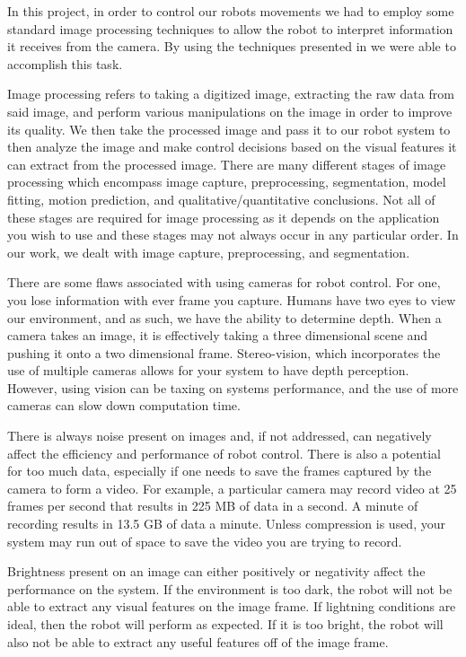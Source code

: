 \documentclass[12pt]{article}
\begin{document}
 In this project, in order to control our robots movements we had to employ some standard image processing techniques to allow the robot to interpret information it receives from the camera. By using the techniques presented in \cite{ImageProcessingTextBook} we were able to accomplish this task.

Image processing refers to taking a digitized image, extracting the raw data from said image, and perform various manipulations on the image in order to improve its quality. We then take the processed image and pass it to our robot system to then analyze the image and make control decisions based on the visual features it can extract from the processed image. There are many different stages of image processing which encompass image capture, preprocessing, segmentation, model fitting, motion prediction, and qualitative/quantitative conclusions. Not all of these stages are required for image processing as it depends on the application you wish to use and these stages may not always occur in any particular order. In our work, we dealt with image capture, preprocessing, and segmentation.

There are some flaws associated with using cameras for robot control. For one, you lose information with ever frame you capture. Humans have two eyes to view our environment, and as such, we have the ability to determine depth. When a camera takes an image, it is effectively taking a three dimensional scene and pushing it onto a two dimensional frame. Stereo-vision, which incorporates the use of multiple cameras allows for your system to have depth perception. However, using vision can be taxing on systems performance, and the use of more cameras can slow down computation time. 

There is always noise present on images and, if not addressed, can negatively affect the efficiency and performance of robot control. There is also a potential for too much data, especially if one needs to save the frames captured by the camera to form a video. For example, a particular camera may record video at 25 frames per second that results in 225 MB of data in a second. A minute of recording results in 13.5 GB of data a minute. Unless compression is used, your system may run out of space to save the video you are trying to record. 

Brightness present on an image can either positively or negativity affect the performance on the system. If the environment is too dark, the robot will not be able to extract any visual features on the image frame. If lightning conditions are ideal, then the robot will perform as expected. If it is too bright, the robot will also not be able to extract any useful features off of the image frame. 
\end{document}
